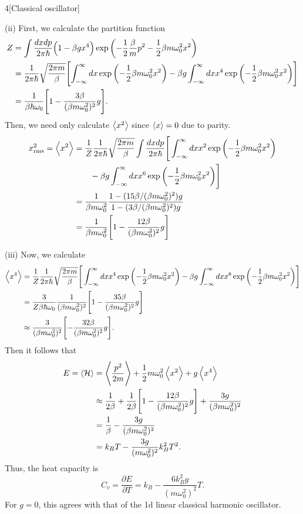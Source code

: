 \documentclass[12pt]{article}
\begin{document}
\begin{problem}{4}[Classical oscillator]
\begin{solution}
(ii) First, we calculate the partition function
\begin{align}
    Z
    &=\int\frac{dxdp}{2\pi\hbar}\qty(1-\beta g
    x^4)\exp\qty(-\frac12\frac\beta{m}p^2-\frac12\beta m\omega_0^2x^2) \notag\\
    &=\frac1{2\pi\hbar}\sqrt{\frac{2\pi m}{\beta}}\qty[\int_{-\infty}^\infty
dx\exp\qty(-\frac12\beta m\omega_0^2x^2)-\beta g\int_{-\infty}^\infty
dxx^4\exp\qty(-\frac12\beta m\omega_0^2x^2)]\notag\\
    &=\frac1{\beta\hbar\omega_0}\qty[1-\frac{3\beta}{(\beta m\omega_0^2)^2}g].
\end{align}
Then, we need only calculate $\expval{x^2}$ since $\expval{x}=0$ due to parity.
\begin{align}
    x_{\text{rms}}^2
    =\expval{x^2}
    &=\frac1Z\frac1{2\pi\hbar}\sqrt{\frac{2\pi
    m}{\beta}}\int\frac{dxdp}{2\pi\hbar}
    \Bigg[\int_{-\infty}^\infty
    dx x^2\exp\qty(-\frac12\beta m\omega_0^2x^2)\notag\\
    &\qquad-\beta g\int_{-\infty}^\infty
    dxx^6\exp\qty(-\frac12\beta m\omega_0^2x^2)\Bigg]\notag\\
    &=\frac1{\beta m\omega_0^2}\frac{1-(15\beta/(\beta
    m\omega_0^2)^2)g}{1-(3\beta/(\beta m\omega_0^2)^2)g}\notag\\
    &=\frac1{\beta m\omega_0^2}\qty[1-\frac{12\beta}{(\beta m\omega_0^2)^2}g]
\end{align}

(iii) Now, we calculate
\begin{align}
    \expval{x^4}
    &=\frac1Z\frac1{2\pi\hbar}\sqrt{\frac{2\pi m}{\beta}}
    \Bigg[
        \int_{-\infty}^\infty dx x^4\exp\qty(-\frac12\beta m\omega_0^2x^2)
        -\beta g
        \int_{-\infty}^\infty dx x^8\exp\qty(-\frac12\beta m\omega_0^2x^2)
    \Bigg]\notag\\
    &=\frac{3}{Z\beta\hbar\omega_0}\frac1{(\beta
        m\omega_0^2)^2}\qty[1-\frac{35\beta}{(\beta m\omega_0^2)^2}g]\notag\\
    &\approx\frac3{(\beta m\omega_0^2)^2}\qty[-\frac{32\beta}{(\beta
    m\omega_0^2)^2}g].
\end{align}
Then it follows that
\begin{align}
    E=\expval{\mathcal{H}}
    &=\expval{\frac{p^2}{2m}}+\frac12m\omega_0^2\expval{x^2}
    +g\expval{x^4}\notag\\
    &\approx\frac1{2\beta}+\frac1{2\beta}\qty[1-\frac{12\beta}{(\beta
    m\omega_0^2)^2}g]+\frac{3g}{(\beta m\omega_0^2)^2}\notag\\
    &=\frac1\beta-\frac{3g}{(\beta m\omega_0^2)^2}\notag\\
    &=k_BT-\frac{3g}{(m\omega_0^2)^2}k_B^2T^2.
\end{align}
Thus, the heat capacity is
\begin{equation}\label{p4b:Cv}
    C_v=\frac{\partial E}{\partial T}
    =k_B-\frac{6k_B^2g}{(m\omega_0^2)^2}T.
\end{equation}
For $g=0$, this agrees with that of the 1d linear classical harmonic oscillator.
\end{solution}


\end{problem}
\end{document}
